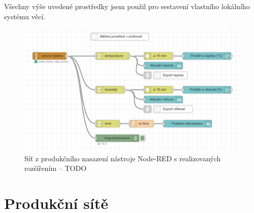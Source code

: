 Všechny výše uvedené prostředky jsem použil pro sestavení vlastního lokálního systému věcí.

\begin{figure}
    \centering
    \includegraphics[width=\textwidth]{figures/fis-flow-1.png}
    \caption{Síť z produkčního nasazení nástroje Node-RED s realizovaných rozšířením -- TODO}
\end{figure}

\section{Produkční sítě}\label{sec:site-nástroje-node-red}
